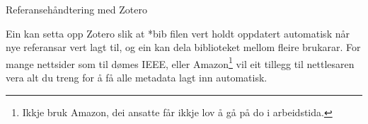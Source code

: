 \begin{frame}{Referansehåndtering med Zotero}

  Ein kan setta opp Zotero slik at *bib filen vert holdt oppdatert automatisk når nye referansar vert lagt til, og ein kan dela biblioteket mellom fleire brukarar. For mange nettsider som til dømes IEEE, eller Amazon\footnote{Ikkje bruk Amazon, dei ansatte får ikkje lov å gå på do i arbeidstida.} vil eit tillegg til nettlesaren vera alt du treng for å få alle metadata lagt inn automatisk.
  
\end{frame}

